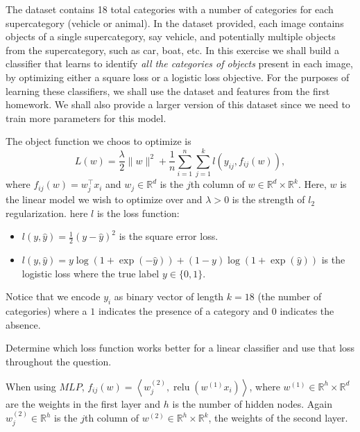 \documentclass[letterpaper,11pt]{article}
\begin{document}
The dataset contains 18 total categories with a number of categories for each
supercategory (vehicle or animal). In the dataset provided, each image contains
objects of a single supercategory, say vehicle, and potentially multiple objects
from the supercategory, such as car, boat, etc. In this exercise we shall build
a classifier that learns to identify \emph{all the categories of objects}
present in each image, by optimizing either a square loss or a logistic loss
objective. For the purposes of learning these classifiers, we shall use the
dataset and features from the first homework. We shall also provide a larger
version of this dataset since we need to train more parameters for this model.

The object function we choos to optimize is
\begin{equation}
  L(w) = \frac{\lambda}{2}\lVert w \rVert^2 +
  \frac{1}{n}\sum_{i=1}^n\sum_{j=1}^k l\left(y_{ij},f_{ij}(w)\right),  
\end{equation}
where $f_{ij}(w) = w_j^\intercal x_i$ and $w_j \in \mathbb{R}^d$ is the $j$th
column of $w \in \mathbb{R}^d \times \mathbb{R}^k$. Here, $w$ is the linear
model we wish to optimize over and $\lambda > 0$ is the strength of $l_2$
regularization. here $l$ is the loss function:
\begin{itemize}
\item $l\left(y,\hat{y}\right) = \frac{1}{2}\left(y - \hat{y}\right)^2$ is the square error
  loss.
\item
  $l\left(y,\hat{y}\right) = y\log\left(1 + \exp\left(-\hat{y}\right)\right) +
  (1-y)\log\left(1 + \exp\left(\hat{y}\right)\right)$ is the logistic loss where
  the true label $y \in \{0,1\}$.
\end{itemize}

Notice that we encode $y_i$ as binary vector of length $k = 18$ (the number of
categories) where a $1$ indicates the presence of a category and $0$ indicates
the absence.

Determine which loss function works better for a linear classifier and use that
loss throughout the question.

When using $MLP$,
$f_{ij}(w) = \left\langle w_j^{(2)},
  \operatorname{relu}\left(w^{(1)}x_i\right)\right\rangle$, where
$w^{(1)} \in \mathbb{R}^h \times \mathbb{R}^d$ are the weights in the first
layer and $h$ is the number of hidden nodes. Again $w_j^{(2)} \in \mathbb{R}^h$
is the $j$th column of $w^{(2)} \in \mathbb{R}^h \times \mathbb{R}^k$, the
weights of the second layer.
\end{document}
